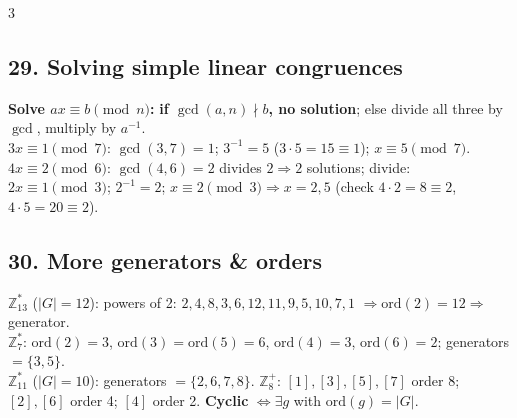 \documentclass[9pt]{extarticle}
\newcommand{\hl}[1]{\textbf{\textcolor{BrickRed}{#1}}}
\begin{document}
\begin{multicols}{3}
\subsection{29. Solving simple linear congruences}
\begin{sloppypar}\raggedright
\textbf{Solve $ax\equiv b\pmod n$:} \hl{if $\gcd(a,n)\nmid b$, no solution}; else divide all three by $\gcd$, multiply by $a^{-1}$.\\
$3x\equiv1\pmod7$: $\gcd(3,7){=}1$; $3^{-1}{=}5$ ($3{\cdot}5{=}15\equiv1$); $x\equiv5\pmod7$.\\
$4x\equiv2\pmod6$: $\gcd(4,6){=}2$ divides $2\Rightarrow2$ solutions; divide: $2x\equiv1\pmod3$; $2^{-1}{=}2$; $x\equiv2\pmod3\Rightarrow x{=}2,5$ (check $4{\cdot}2{=}8\equiv2$, $4{\cdot}5{=}20\equiv2$).
\end{sloppypar}

\subsection{30. More generators \& orders}
\begin{sloppypar}\raggedright
$\mathbb Z_{13}^*$ ($|G|{=}12$): powers of 2: $2,4,8,3,6,12,11,9,5,10,7,1$ $\Rightarrow\mathrm{ord}(2){=}12\Rightarrow$ generator.\\
$\mathbb Z_7^*$: $\mathrm{ord}(2){=}3$, $\mathrm{ord}(3){=}\mathrm{ord}(5){=}6$, $\mathrm{ord}(4){=}3$, $\mathrm{ord}(6){=}2$; generators $=\{3,5\}$.\\
$\mathbb Z_{11}^*$ ($|G|{=}10$): generators $=\{2,6,7,8\}$. $\mathbb Z_8^+$: $[1],[3],[5],[7]$ order 8; $[2],[6]$ order 4; $[4]$ order 2. \hl{Cyclic} $\iff\exists g$ with $\mathrm{ord}(g){=}|G|$.
\end{sloppypar}


\end{multicols}
\end{document}
